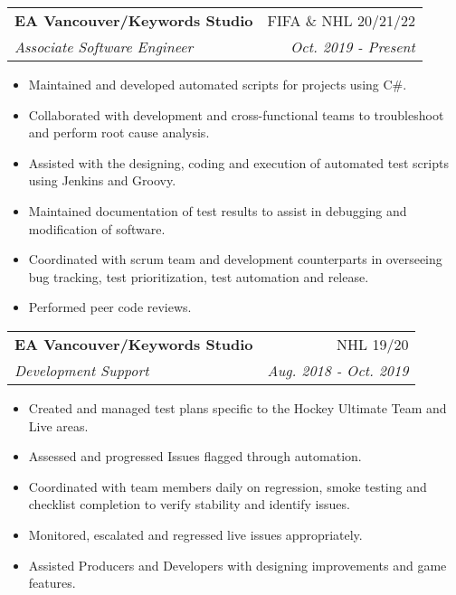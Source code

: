 \documentclass[letterpaper,11pt]{article}
\makeatletter
\newcommand{\ressubheading}[4]{
\begin{tabular*}{7.0in}{l@{\extracolsep{\fill}}r}
		\textbf{#1} & #2 \\
		\textit{#3} & \textit{#4} \\
\end{tabular*}\vspace{-6pt}}
\makeatother
\begin{document}
\begin{description}
\item    
    \ressubheading{EA Vancouver/Keywords Studio}{FIFA \& NHL 20/21/22}{Associate Software Engineer}{Oct. 2019 - Present}
	\begin{itemize}
	    \item{Maintained and developed automated scripts for projects using C\#.}
	    \item{Collaborated with development and cross-functional teams to troubleshoot and perform root cause analysis.}
	    \item{Assisted with the designing, coding and execution of automated test scripts using Jenkins and Groovy.}
        \item{Maintained documentation of test results to assist in debugging and modification of software.}
        \item{Coordinated with scrum team and development counterparts in overseeing bug tracking, test prioritization, test automation and release.}
        \item{Performed peer code reviews.}
    \end{itemize}
\item    
    \ressubheading{EA Vancouver/Keywords Studio}{NHL 19/20}{Development Support}{Aug. 2018 - Oct. 2019}
	\begin{itemize}
        \item{Created and managed test plans specific to the Hockey Ultimate Team and Live areas.}
        \item{Assessed and progressed Issues flagged through automation.}
        \item{Coordinated with team members daily on regression, smoke testing and checklist completion to verify stability and identify issues.}
        \item{Monitored, escalated and regressed live issues appropriately.}
        \item{Assisted Producers and Developers with designing improvements and game features.}
    \end{itemize}


\end{description}
\end{document}
